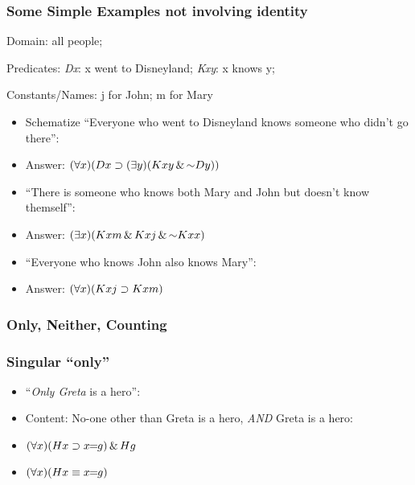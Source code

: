 \begin{frame}
\frametitle{Some Simple Examples not involving identity}


Domain: all people; 

Predicates: \emph{Dx}: x went to Disneyland; \emph{Kxy}: x knows y; 

Constants/Names: j for John; m for Mary

\begin{itemize}[<+->]

\item Schematize ``Everyone who went to Disneyland knows someone who didn't go there'':

\item[] Answer: $\qt{\forall}{x} ( Dx \eif \qt{\exists}{y} ( Kxy \eand \enot Dy))$

\item ``There is someone who knows both Mary and John but doesn't know themself'':

\item[] Answer: $\qt{\exists}{x} (Kxm \eand Kxj \eand \enot Kxx)$

\item ``Everyone who knows John also knows Mary'':

\item[] Answer: $(\forall x) (Kxj \supset Kxm)$



\end{itemize}
\end{frame}

\subsubsection{Only, Neither, Counting}

\begin{frame}
  \frametitle{Singular ``only''}

  \begin{itemize}[<+->]
    \item ``\emph{Only Greta} is a hero'':
    \item Content: No-one other than Greta is a hero, \emph{AND} Greta is a hero:
    \item[] \emph{$(\forall x)(Hx \supset x\!\!=\!\!g) \,\&\, Hg$}
    \item[] \emph{$(\forall x)(Hx \equiv x\!\!=\!\!g)$}
  \end{itemize}
  \end{frame}

